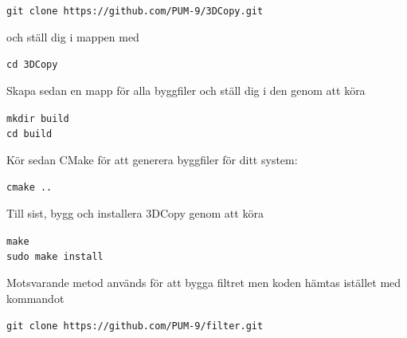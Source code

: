 \documentclass[a4paper,titlepage,12pt]{article}
\begin{document}
	\texttt{git clone https://github.com/PUM-9/3DCopy.git}
	
	och ställ dig i mappen med
	
	\texttt{cd 3DCopy}
	
	Skapa sedan en mapp för alla byggfiler och ställ dig i den genom att köra
	
	\texttt{mkdir build \\
	cd build}
	
	Kör sedan CMake för att generera byggfiler för ditt system:
	
	\texttt{cmake ..}
	
	Till sist, bygg och installera 3DCopy genom att köra
	
	\texttt{make \\
	sudo make install}

	Motsvarande metod används för att bygga filtret men koden hämtas istället med kommandot
	
	\texttt{git clone https://github.com/PUM-9/filter.git}
\newpage
\end{document}
